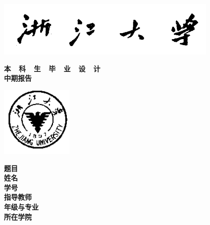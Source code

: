 \thispagestyle{empty}

{
\setlength{\parindent}{0em}
\renewcommand{\baselinestretch}{2}

\vspace*{-7mm}

\begin{center}
  \includegraphics[width=108mm]{data/cover/xiaoming}
\end{center}

\vspace{-1mm}

{
\renewcommand{\baselinestretch}{1.8}
\heiti\erhao\bfseries
\centering
本~~科~~生~~毕~~业~~设~~计 \\
中期报告 \par
}

\vspace{4em}

\begin{center}
  \includegraphics[width=35mm]{data/cover/xiaobiao}
\end{center}

\vspace{3em}

{
\renewcommand{\baselinestretch}{1.65}
\songti\sanhao\bfseries
\centering
题目 \; \underline{\makebox[16em]{\zjutitlec}} \\
姓名 \; \underline{\makebox[16em]{\zjuauthornamec}} \\
学号 \; \underline{\makebox[16em]{\zjuauthorid}} \\
指导教师 \; \underline{\makebox[14em]{\zjumentorc}} \\
年级与专业 \; \underline{\makebox[13em]{\zjugrade~~\zjumajor}} \\
所在学院 \; \underline{\makebox[14em]{\zjucollegec}} \par
}
}